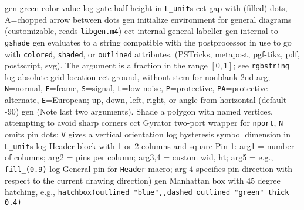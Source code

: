   {gen}
  {green color value}
  {log}
  {gate half-height in {\tt L\_unit}s}
  {cct}
  {gap with (filled) dots, A=chopped arrow between dots}
  {gen}
  {initialize environment for general diagrams
    (customizable, reads {\tt libgen.m4})}
  {cct}
  {internal general labeller}
  {gen}
  {internal to {\tt gshade}}
  {gen}
  {evaluates to a string compatible with the postprocessor in use
   to go with {\tt colored}, {\tt shaded}, or {\tt outlined} attributes.
   (PSTricks, metapost, pgf-tikz, pdf, postscript, svg).
   The argument is a fraction in the range $[0,1]$; see {\tt rgbstring}}
  {log}
  {absolute grid location}
  {cct}
  { ground, without stem for nonblank 2nd arg;
    {\tt N}=normal, {\tt F}=frame, {\tt S}=signal, {\tt L}=low-noise,
    {\tt P}=protective,
    {\tt PA}=protective alternate,
    {\tt E}=European; up, down, left, right, or angle
    from horizontal (default -90) 
   }
  {gen}
  {(Note last two arguments).  Shade a polygon with named
    vertices, attempting to avoid sharp corners}
  {cct}
  {Gyrator two-port wrapper for {\tt nport}, {\tt N} omits pin dots; {\tt V}
   gives a vertical orientation
   }
  {log}
  {hysteresis symbol dimension in {\tt L\_unit}s}
  {log}
  {Header block with 1 or 2 columns and square Pin 1:
   arg1 = number of columns;
   arg2 = pins per column;
   arg3,4 = custom wid, ht;
   arg5 = e.g., {\tt fill\_(0.9)}
    }
  {log}
  {General pin for {\tt Header} macro; arg 4 specifies pin direction
   with respect to the current drawing direction)}
  {gen}
  {Manhattan box with 45 degree hatching, e.g.,
   {\tt hatchbox(outlined "blue",,dashed outlined "green" thick 0.4)}}
